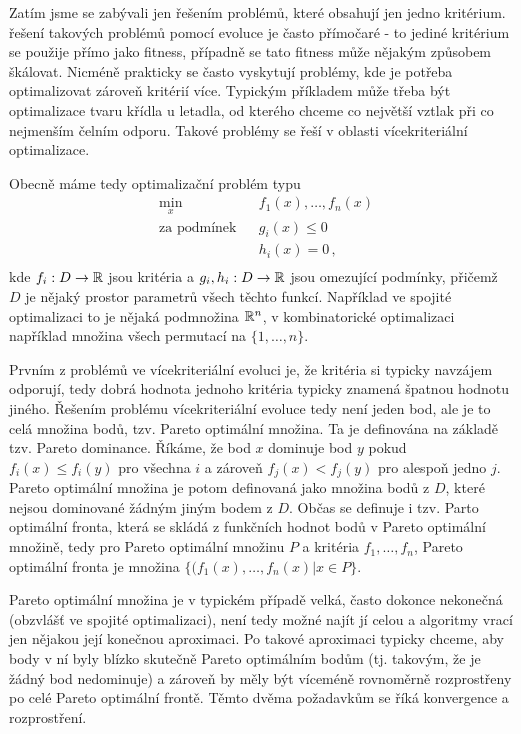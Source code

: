 
Zatím jsme se zabývali jen řešením problémů, které obsahují jen jedno kritérium. řešení takových problémů pomocí evoluce je často přímočaré - to jediné kritérium se použije přímo jako fitness, případně se tato fitness může nějakým způsobem škálovat. Nicméně prakticky se často vyskytují problémy, kde je potřeba optimalizovat zároveň kritérií více. Typickým příkladem může třeba být optimalizace tvaru křídla u letadla, od kterého chceme co největší vztlak při co nejmenším čelním odporu. Takové problémy se řeší v oblasti vícekriteriální optimalizace. 

Obecně máme tedy optimalizační problém typu
\begin{equation*}
  \begin{aligned}
  & \underset{x}{\text{min}} 	& & f_1(x), \dots, f_n(x) \\
  & \text{za podmínek} 				& & g_i(x) \leq 0 \\
  & 													& & h_i(x) = 0 \,,\\
  \end{aligned}
\end{equation*}
kde $f_i: D \to {\ensuremath{\mathbb{R}}}$ jsou kritéria a $g_i, h_i: D \to {\ensuremath{\mathbb{R}}}$ jsou omezující podmínky, přičemž $D$ je nějaký prostor parametrů všech těchto funkcí. Například ve spojité optimalizaci to je nějaká podmnožina ${\mathbb{R}}^n$, v kombinatorické optimalizaci například množina všech permutací na $\{1, \dots, n\}$.

Prvním z problémů ve vícekriteriální evoluci je, že kritéria si typicky navzájem odporují, tedy dobrá hodnota jednoho kritéria typicky znamená špatnou hodnotu jiného. Řešením problému vícekriteriální evoluce tedy není jeden bod, ale je to celá množina bodů, tzv. Pareto optimální množina. Ta je definována na základě tzv. Pareto dominance. Říkáme, že bod $x$ dominuje bod $y$ pokud $f_i(x) \leq f_i(y)$ pro všechna $i$ a zároveň $f_j(x) < f_j(y)$ pro alespoň jedno $j$. Pareto optimální množina je potom definovaná jako množina bodů z $D$, které nejsou dominované žádným jiným bodem z $D$. Občas se definuje i tzv. Parto optimální fronta, která se skládá z funkčních hodnot bodů v Pareto optimální množině, tedy pro Pareto optimální množinu $P$ a kritéria $f_1, \dots, f_n$, Pareto optimální fronta je množina $\{(f_1(x), \dots, f_n(x)| x \in P\}$. 

Pareto optimální množina je v typickém případě velká, často dokonce nekonečná (obzvlášť ve spojité optimalizaci), není tedy možné najít jí celou a algoritmy vrací jen nějakou její konečnou aproximaci. Po takové aproximaci typicky chceme, aby body v ní byly blízko skutečně Pareto optimálním bodům (tj. takovým, že je žádný bod nedominuje) a zároveň by měly být víceméně rovnoměrně rozprostřeny po celé Pareto optimální frontě. Těmto dvěma požadavkům se říká konvergence a rozprostření.

